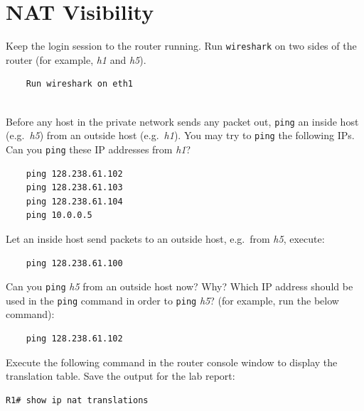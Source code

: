 \documentclass{UTNetLab}
\begin{document}
\section{NAT Visibility}
    Keep the login session to the router running. Run \lstinline{wireshark} on two sides of the router (for example, \textit{h1} and  \textit{h5}).

    \begin{lstlisting}
    Run wireshark on eth1
       
    \end{lstlisting}
    

    Before any host in the private network sends any packet out, \lstinline{ping} an inside host (e.g.\ \textit{h5}) from an outside host (e.g.\ \textit{h1}). You may try to \lstinline{ping} the following IPs. Can you \lstinline{ping} these IP addresses from \textit{h1}?
    
    \begin{lstlisting}
    ping 128.238.61.102
    ping 128.238.61.103
    ping 128.238.61.104
    ping 10.0.0.5
    \end{lstlisting}
   

    Let an inside host send packets to an outside host, e.g.\ from \textit{h5}, execute:

    \begin{lstlisting}
    ping 128.238.61.100
    \end{lstlisting}
    Can you \lstinline{ping} \textit{h5} from an outside host now? Why? Which IP address should be used in the \lstinline{ping} command in order to \lstinline{ping} \textit{h5}? (for example, run the below command):

\begin{lstlisting}
    ping 128.238.61.102
\end{lstlisting}
    Execute the following command in the router console window to display the translation table. Save the output for the lab report: 
    
    \begin{lstlisting}[language={cisco}, frame=trBL]
    R1# show ip nat translations
    \end{lstlisting}
    
\end{document}
